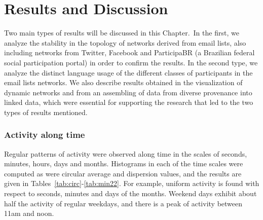 \chapter{Results and Discussion}
\label{ch:disc}

Two main types of results will be discussed in this Chapter. In the first, we analyze the stability in the topology of networks derived from email lists, also including networks from Twitter, Facebook and ParticipaBR (a Brazilian federal social participation portal) in order to confirm the results. In the second type, we analyze the distinct language usage of the different classes of participants in the email lists networks.
We also describe results obtained in the visualization of dynamic networks
and from an assembling of data from diverse provenance into linked data, which were essential for supporting the research that led to the two types of results mentioned.


\subsection{Activity along time}\label{constDisc}
Regular patterns of activity were observed along time
in the scales of seconds, minutes, hours, days and months.
Histograms in each of the time scales were computed as were circular average and dispersion values, and the results are given in Tables~\ref{tab:circ}-\ref{tab:min22}. For example, uniform activity is found with respect to seconds, minutes and days of the months. Weekend days exhibit about half the activity of regular weekdays, and there is a peak of activity between 11am and noon.


